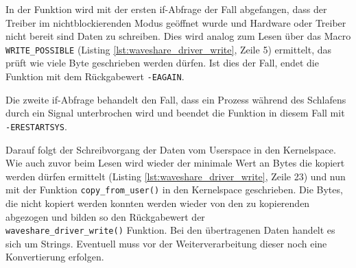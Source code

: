 In der Funktion wird mit der ersten if-Abfrage der Fall abgefangen, dass der Treiber im nichtblockierenden Modus geöffnet wurde und Hardware oder Treiber nicht bereit sind Daten zu schreiben. Dies wird analog zum Lesen über das Macro \texttt{WRITE\_POSSIBLE} (Listing \ref{lst:waveshare_driver_write}, Zeile 5) ermittelt, das prüft wie viele Byte geschrieben werden dürfen. Ist dies der Fall, endet die Funktion mit dem Rückgabewert \texttt{-EAGAIN}.

Die zweite if-Abfrage behandelt den Fall, dass ein Prozess während des Schlafens durch ein Signal unterbrochen wird und beendet die Funktion in diesem Fall mit \texttt{-ERESTARTSYS}.

Darauf folgt der Schreibvorgang der Daten vom Userspace in den Kernelspace. Wie auch zuvor beim Lesen wird wieder der minimale Wert an Bytes die kopiert werden dürfen ermittelt (Listing \ref{lst:waveshare_driver_write}, Zeile 23) und nun mit der Funktion \texttt{copy_from_user()} in den Kernelspace geschrieben. Die Bytes, die nicht kopiert werden konnten werden wieder von den zu kopierenden abgezogen und bilden so den Rückgabewert der \\ \texttt{waveshare_driver_write()} Funktion. Bei den übertragenen Daten handelt es sich um Strings. Eventuell muss vor der Weiterverarbeitung dieser noch eine Konvertierung erfolgen.


